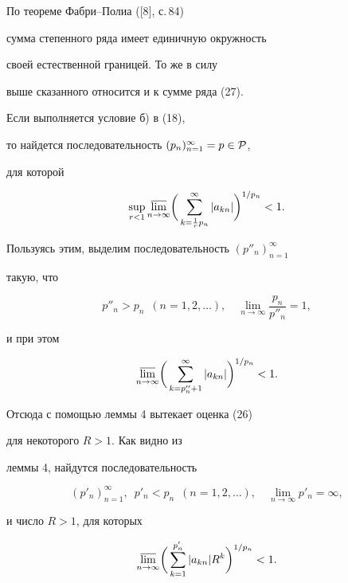  


По теореме Фабри--Полиа ([8], с.\,84) 


сумма степенного ряда имеет единичную окружность 


своей естественной границей. То же в силу 


выше сказанного относится и к сумме ряда (27). 


 


Если выполняется условие б) в (18), 


то найдется последовательность $(p_n)^\infty_{n=1}=p\in\cal P$, 


для которой 


$$ 


\sup_{r<1}\underset{n\to\infty}{\varlimsup}{}\bigg( 


\sum^\infty_{k=\frac{1}{r}p_n}|a_{kn}|\bigg)^{1/p_n}<1. 


$$ 


Пользуясь этим, выделим последовательность $(p''_n)^\infty_{n=1}$ 


такую, что 


$$ 


p''_n>p_n\ \; (n=1,2,\dotsc),\quad 


\lim_{n\to\infty}\frac{p_n}{p''_n}=1, 


$$ 


и при этом 


$$ 


\underset{n\to\infty}{\varlimsup}{}\bigg( 


\sum^\infty_{k=p''_n+1}|a_{kn}|\bigg)^{1/p_n}<1. 


$$ 


Отсюда с помощью леммы 4 вытекает оценка (26) 


для некоторого $R>1$. Как видно из 


леммы 4, найдутся последовательность 


$$ 


(p'_n)^\infty_{n=1},\ \; p'_n<p_n\ \; (n=1,2,\dotsc),\quad 


\lim_{n\to\infty}p'_n=\infty, 


$$ 


и число $R>1$, для которых 


\begin{equation} 


\underset{n\to\infty}{\varlimsup}{}\bigg( 


\sum^{p'_n}_{k=1}|a_{kn}|R^k\bigg)^{1/p_n}<1. 


\end{equation} 


